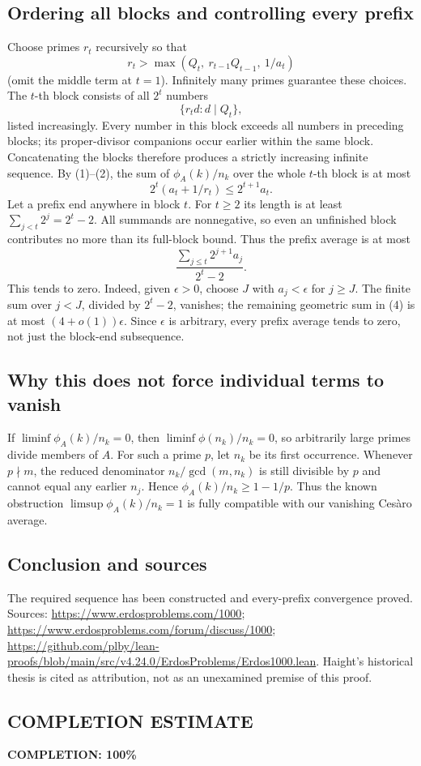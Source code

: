 \subsection*{Ordering all blocks and controlling every prefix}
Choose primes $r_t$ recursively so that
\[
 r_t>\max(Q_t,\ r_{t-1}Q_{t-1},\ 1/a_t)
\]
(omit the middle term at $t=1$). Infinitely many primes guarantee these choices.
The $t$-th block consists of all $2^t$ numbers
\[
 \{r_td:d\mid Q_t\},
\]
listed increasingly. Every number in this block exceeds all numbers in preceding blocks; its proper-divisor companions occur earlier within the same block. Concatenating the blocks therefore produces a strictly increasing infinite sequence.
By (1)--(2), the sum of $\phi_A(k)/n_k$ over the whole $t$-th block is at most
\[
 2^t(a_t+1/r_t)\le2^{t+1}a_t.
 \tag{3}
\]
Let a prefix end anywhere in block $t$. For $t\ge2$ its length is at least
$\sum_{j<t}2^j=2^t-2$.
All summands are nonnegative, so even an unfinished block contributes no more than its full-block bound. Thus the prefix average is at most
\[
 \frac{\sum_{j\le t}2^{j+1}a_j}{2^t-2}.
 \tag{4}
\]
This tends to zero. Indeed, given $\epsilon>0$, choose $J$ with $a_j<\epsilon$ for $j\ge J$.
The finite sum over $j<J$, divided by $2^t-2$, vanishes; the remaining geometric sum in (4) is at most $(4+o(1))\epsilon$.
Since $\epsilon$ is arbitrary, every prefix average tends to zero, not just the block-end subsequence.

\subsection*{Why this does not force individual terms to vanish}
If $\liminf\phi_A(k)/n_k=0$, then $\liminf\phi(n_k)/n_k=0$, so arbitrarily large primes divide members of $A$. For such a prime $p$, let $n_k$ be its first occurrence. Whenever $p\nmid m$, the reduced denominator $n_k/\gcd(m,n_k)$ is still divisible by $p$ and cannot equal any earlier $n_j$. Hence $\phi_A(k)/n_k\ge1-1/p$.
Thus the known obstruction $\limsup\phi_A(k)/n_k=1$ is fully compatible with our vanishing Ces\`aro average.

\subsection*{Conclusion and sources}
The required sequence has been constructed and every-prefix convergence proved. Sources: \url{https://www.erdosproblems.com/1000}; \url{https://www.erdosproblems.com/forum/discuss/1000}; \url{https://github.com/plby/lean-proofs/blob/main/src/v4.24.0/ErdosProblems/Erdos1000.lean}. Haight's historical thesis is cited as attribution, not as an unexamined premise of this proof.
\subsection*{COMPLETION ESTIMATE}
\textbf{COMPLETION: 100\%}
